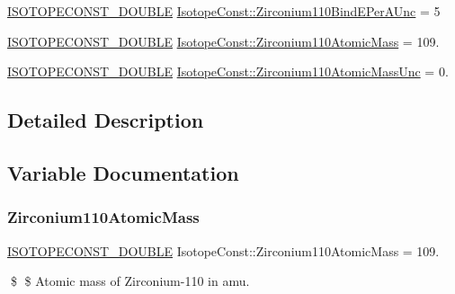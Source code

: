 \begin{DoxyCompactItemize}
\mbox{\hyperlink{group___isotope_const-_macros_ga8f45a7272ce02c0b4c65c44636ed719a}{I\+S\+O\+T\+O\+P\+E\+C\+O\+N\+S\+T\+\_\+\+D\+O\+U\+B\+LE}} \mbox{\hyperlink{group___isotope_const-_zirconium-_zr110_ga524788facfecdfb024d87bff944b5a62}{Isotope\+Const\+::\+Zirconium110\+Bind\+E\+Per\+A\+Unc}} = 5
\item 
\mbox{\hyperlink{group___isotope_const-_macros_ga8f45a7272ce02c0b4c65c44636ed719a}{I\+S\+O\+T\+O\+P\+E\+C\+O\+N\+S\+T\+\_\+\+D\+O\+U\+B\+LE}} \mbox{\hyperlink{group___isotope_const-_zirconium-_zr110_ga621857c21032eb9a28ce3f81600a8d33}{Isotope\+Const\+::\+Zirconium110\+Atomic\+Mass}} = 109.
\item 
\mbox{\hyperlink{group___isotope_const-_macros_ga8f45a7272ce02c0b4c65c44636ed719a}{I\+S\+O\+T\+O\+P\+E\+C\+O\+N\+S\+T\+\_\+\+D\+O\+U\+B\+LE}} \mbox{\hyperlink{group___isotope_const-_zirconium-_zr110_gac4afc24544d168a2986e8dd80bc2e5c4}{Isotope\+Const\+::\+Zirconium110\+Atomic\+Mass\+Unc}} = 0.
\end{DoxyCompactItemize}


\subsection{Detailed Description}


\subsection{Variable Documentation}
\mbox{\label{group___isotope_const-_zirconium-_zr110_ga621857c21032eb9a28ce3f81600a8d33}} 
\subsubsection{\texorpdfstring{Zirconium110\+Atomic\+Mass}{Zirconium110AtomicMass}}
{\footnotesize\ttfamily \mbox{\hyperlink{group___isotope_const-_macros_ga8f45a7272ce02c0b4c65c44636ed719a}{I\+S\+O\+T\+O\+P\+E\+C\+O\+N\+S\+T\+\_\+\+D\+O\+U\+B\+LE}} Isotope\+Const\+::\+Zirconium110\+Atomic\+Mass = 109.}

\$ \$ Atomic mass of Zirconium-\/110 in amu. \mbox{\label{group___isotope_const-_zirconium-_zr110_gac4afc24544d168a2986e8dd80bc2e5c4}} 
